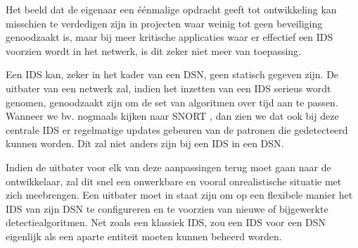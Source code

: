 Het beeld dat de eigenaar een \'e\'enmalige opdracht geeft tot ontwikkeling kan
misschien te verdedigen zijn in projecten waar weinig tot geen beveiliging
genoodzaakt is, maar bij meer kritische applicaties waar er effectief een IDS
voorzien wordt in het netwerk, is dit zeker niet meer van toepassing.

Een IDS kan, zeker in het kader van een DSN, geen statisch gegeven zijn. De
uitbater van een netwerk zal, indien het inzetten van een IDS serieus wordt
genomen, genoodzaakt zijn om de set van algoritmen over tijd aan te passen.
Wanneer we bv. nogmaals kijken naar SNORT \citep{roesch1999snort}, dan zien we
dat ook bij deze centrale IDS er regelmatige updates gebeuren van de patronen
die gedetecteerd kunnen worden. Dit zal niet anders zijn bij een IDS in een DSN.

Indien de uitbater voor elk van deze aanpassingen terug moet gaan naar de
ontwikkelaar, zal dit snel een onwerkbare en vooral onrealistische situatie met
zich meebrengen. Een uitbater moet in staat zijn om op een flexibele manier het
IDS van zijn DSN te configureren en te voorzien van nieuwe of bijgewerkte
detectiealgoritmen. Net zoals een klassiek IDS, zou een IDS voor een DSN
eigenlijk als een aparte entiteit moeten kunnen beheerd worden.
